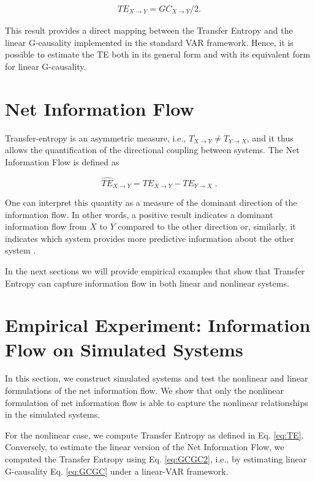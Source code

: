 \documentclass[]{book}
\theoremstyle{definition}
\theoremstyle{definition}
\theoremstyle{definition}
\theoremstyle{remark}
\begin{document}
\begin{align}
TE_{X \rightarrow Y} = GC_{X \rightarrow Y}/2.
\label{eq:GCGC2}
\end{align}

This result provides a direct mapping between the Transfer Entropy and
the linear G-causality implemented in the standard VAR framework. Hence,
it is possible to estimate the TE both in its general form and with its
equivalent form for linear G-causality.

\section{Net Information Flow}\label{net-information-flow}

Transfer-entropy is an asymmetric measure, i.e.,
\(T_{X \rightarrow Y} \neq T_{Y \rightarrow X}\), and it thus allows the
quantification of the directional coupling between systems. The Net
Information Flow is defined as

\begin{equation}
\widehat{TE}_{X \rightarrow Y} = TE_{X \rightarrow Y} - TE_{Y \rightarrow X}\;.
\end{equation}

One can interpret this quantity as a measure of the dominant direction
of the information flow. In other words, a positive result indicates a
dominant information flow from \(X\) to \(Y\) compared to the other
direction or, similarly, it indicates which system provides more
predictive information about the other system
\citep{Michalowicz:2013:HDE:2601840}.

In the next sections we will provide empirical examples that show that
Transfer Entropy can capture information flow in both linear and
nonlinear systems.

\section{Empirical Experiment: Information Flow on Simulated
Systems}\label{empirical-experiment-information-flow-on-simulated-systems}

In this section, we construct simulated systems and test the nonlinear
and linear formulations of the net information flow. We show that only
the nonlinear formulation of net information flow is able to capture the
nonlinear relationships in the simulated systems.

For the nonlinear case, we compute Transfer Entropy as defined in Eq.
\eqref{eq:TE}. Conversely, to estimate the linear version of the Net
Information Flow, we computed the Transfer Entropy using Eq.
\eqref{eq:GCGC2}, i.e., by estimating linear G-causality Eq. \eqref{eq:GCGC}
under a linear-VAR framework.
\end{document}
